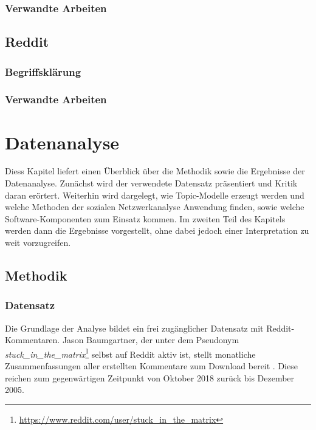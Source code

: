 \documentclass[11pt,a4paper,twoside]{article}
\let\rmarkdownfootnote\footnote%
\def\footnote{\protect\rmarkdownfootnote}
\begin{document}
\hypertarget{verwandte-arbeiten-1}{%
\subsubsection{Verwandte Arbeiten}\label{verwandte-arbeiten-1}}

\hypertarget{reddit}{%
\subsection{Reddit}\label{reddit}}

\hypertarget{begriffsklarung}{%
\subsubsection{Begriffsklärung}\label{begriffsklarung}}

\hypertarget{verwandte-arbeiten-2}{%
\subsubsection{Verwandte Arbeiten}\label{verwandte-arbeiten-2}}

\cleardoublepage

\hypertarget{datenanalyse}{%
\section{Datenanalyse}\label{datenanalyse}}

Diess Kapitel liefert einen Überblick über die Methodik sowie die
Ergebnisse der Datenanalyse. Zunächst wird der verwendete Datensatz
präsentiert und Kritik daran erörtert. Weiterhin wird dargelegt, wie
Topic-Modelle erzeugt werden und welche Methoden der sozialen
Netzwerkanalyse Anwendung finden, sowie welche Software-Komponenten zum
Einsatz kommen. Im zweiten Teil des Kapitels werden dann die Ergebnisse
vorgestellt, ohne dabei jedoch einer Interpretation zu weit
vorzugreifen.

\hypertarget{methodik}{%
\subsection{Methodik}\label{methodik}}

\hypertarget{datensatz}{%
\subsubsection{Datensatz}\label{datensatz}}

Die Grundlage der Analyse bildet ein frei zugänglicher Datensatz mit
Reddit-Kommentaren. Jason Baumgartner, der unter dem Pseudonym
\emph{stuck\_in\_the\_matrix}\footnote{\url{https://www.reddit.com/user/stuck_in_the_matrix}}
selbst auf Reddit aktiv ist, stellt monatliche Zusammenfassungen aller
erstellten Kommentare zum Download bereit \autocite{Baumgartner}. Diese
reichen zum gegenwärtigen Zeitpunkt von Oktober 2018 zurück bis Dezember
2005.
\end{document}
